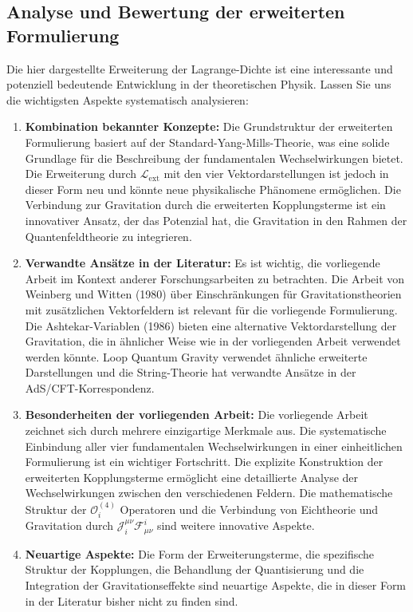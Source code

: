 \documentclass{article}
\begin{document}
\subsection{Analyse und Bewertung der erweiterten Formulierung}

Die hier dargestellte Erweiterung der Lagrange-Dichte ist eine interessante und potenziell bedeutende Entwicklung in der theoretischen Physik. Lassen Sie uns die wichtigsten Aspekte systematisch analysieren:

\begin{enumerate}
	\item \textbf{Kombination bekannter Konzepte:} Die Grundstruktur der erweiterten Formulierung basiert auf der Standard-Yang-Mills-Theorie, was eine solide Grundlage für die Beschreibung der fundamentalen Wechselwirkungen bietet. Die Erweiterung durch $\mathcal{L}_\text{ext}$ mit den vier Vektordarstellungen ist jedoch in dieser Form neu und könnte neue physikalische Phänomene ermöglichen. Die Verbindung zur Gravitation durch die erweiterten Kopplungsterme ist ein innovativer Ansatz, der das Potenzial hat, die Gravitation in den Rahmen der Quantenfeldtheorie zu integrieren.
	
	\item \textbf{Verwandte Ansätze in der Literatur:} Es ist wichtig, die vorliegende Arbeit im Kontext anderer Forschungsarbeiten zu betrachten. Die Arbeit von Weinberg und Witten (1980) über Einschränkungen für Gravitationstheorien mit zusätzlichen Vektorfeldern ist relevant für die vorliegende Formulierung. Die Ashtekar-Variablen (1986) bieten eine alternative Vektordarstellung der Gravitation, die in ähnlicher Weise wie in der vorliegenden Arbeit verwendet werden könnte. Loop Quantum Gravity verwendet ähnliche erweiterte Darstellungen und die String-Theorie hat verwandte Ansätze in der AdS/CFT-Korrespondenz.
	
	\item \textbf{Besonderheiten der vorliegenden Arbeit:} Die vorliegende Arbeit zeichnet sich durch mehrere einzigartige Merkmale aus. Die systematische Einbindung aller vier fundamentalen Wechselwirkungen in einer einheitlichen Formulierung ist ein wichtiger Fortschritt. Die explizite Konstruktion der erweiterten Kopplungsterme ermöglicht eine detaillierte Analyse der Wechselwirkungen zwischen den verschiedenen Feldern. Die mathematische Struktur der $\mathcal{O}_i^{(4)}$ Operatoren und die Verbindung von Eichtheorie und Gravitation durch $\mathcal{J}_i^{\mu\nu}\mathcal{F}_{\mu\nu}^i$ sind weitere innovative Aspekte.
	
	\item \textbf{Neuartige Aspekte:} Die Form der Erweiterungsterme, die spezifische Struktur der Kopplungen, die Behandlung der Quantisierung und die Integration der Gravitationseffekte sind neuartige Aspekte, die in dieser Form in der Literatur bisher nicht zu finden sind.
	
\end{enumerate}
\end{document}
